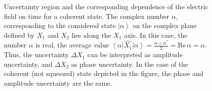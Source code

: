 \begin{figure}
\centering



\caption{Uncertainty region and the corresponding dependence of the 
  electric field on time for a coherent state.
  The complex number $\alpha$,
  corresponding to the considered state $\left|\alpha\right>$ on the
  complex plane defined by $X_1$ and $X_2$ lies along the
  $X_1$ axis.
  In this case, the number $\alpha$ is real, the average value
  $\left<\alpha\right|\hat{X_1}\left|\alpha\right> =
  \frac{\alpha + \alpha^\ast}{2} = 
  \text{Re} \, \alpha = \alpha$.
  Thus, the uncertainty $\Delta X_1$ can
  be interpreted as amplitude uncertainty, and $\Delta X_2$ as
  phase uncertainty. In the case of the coherent
  (not squeezed) state depicted in the figure, the phase and amplitude uncertainty are the same.}
\label{figPart3Squeezed_1}
\end{figure}